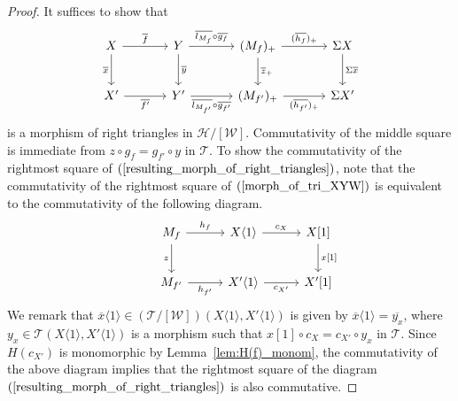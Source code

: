 \documentclass[a4paper,reqno,10pt]{amsart}
\theoremstyle{definition}
\theoremstyle{definition}
\theoremstyle{definition}
\theoremstyle{definition}
\theoremstyle{plain}
\newcommand{\CH}{\mathcal{H}}
\newcommand{\CT}{\mathcal{T}}
\newcommand{\CW}{\mathcal{W}}
\begin{document}
\begin{proof}
It suffices to show that
\begin{equation}\label{resulting_morph_of_right_triangles}
\begin{tikzcd}[row sep=0.8cm, column sep=1.2cm]
X\arrow[r, "\overline{f}"]
\arrow[d, swap, "\overline{x}" ]
&Y\arrow[r, "\overline{l_{M_f}}\circ \overline{g_f}"]
\arrow[d, "\overline{y}"]
&(M_f)_+ \arrow[r, "(\overline{h_f})_+"]
\arrow[d, "\overline{z}_+"]
&\Sigma X
\arrow[d, "\Sigma\overline{x}"]
\\
X'\arrow[r, swap, "\overline{f'}"]
&Y'\arrow[r, swap, "\overline{l_{M_{f'}}}\circ\overline{g_{f'}}"]
&(M_{f'})_+ \arrow[r, swap, "(\overline{h_{f'}})_+"]
&\Sigma X'
\end{tikzcd}
\end{equation}
is a morphism of right triangles in $\CH/[\CW]$.
Commutativity of the middle square is immediate from $z\circ g_f=g_{f'}\circ y$ in $\CT$. %
To show the commutativity of the rightmost square of $(\ref{resulting_morph_of_right_triangles})$, note that the commutativity of the rightmost square of $(\ref{morph_of_tri_XYW})$ is equivalent to the commutativity of the following diagram.
\[
\begin{tikzcd}[row sep=0.8cm, column sep=1.0cm]
&M_f \arrow[r, "h_{f}"]
\arrow[d, swap, "z"]
&X\langle1\rangle \arrow[r, "c_X"]
&X[1]
\arrow[d, "x{[}1{]}"]
\\
&M_{f'} \arrow[r, swap, "h_{f'}"]
&X'\langle1\rangle \arrow[r, swap, "c_{X'}"]
&X'[1]
\end{tikzcd}
\]
We remark that $\overline{x}\langle1\rangle\in(\CT/[\CW])(X\langle1\rangle,X'\langle1\rangle)$ is given by $\overline{x}\langle1\rangle=\overline{y_x}$, where $y_x\in\CT(X\langle1\rangle,X'\langle1\rangle)$ is a morphism such that $x[1]\circ c_X=c_{X'}\circ y_x$ in $\CT$. Since $H(c_{X'})$ is monomorphic by Lemma~\ref{lem:H(f)_monom}, the commutativity of the above diagram implies that the rightmost square of the diagram $(\ref{resulting_morph_of_right_triangles})$ is also commutative. 
\end{proof}
\end{document}
